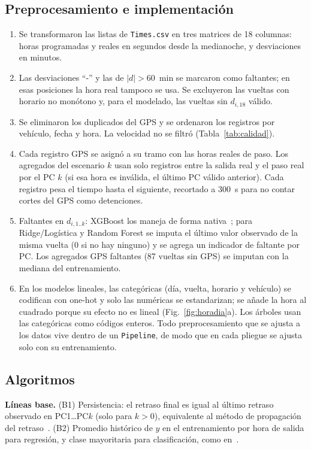 \documentclass[conference]{IEEEtran}
\begin{document}
\subsection{Preprocesamiento e implementación}\label{sec:prep}
\begin{enumerate}
\item Se transformaron las listas de \texttt{Times.csv} en tres matrices de 18 columnas: horas programadas y reales en segundos desde la medianoche, y desviaciones en minutos.
\item Las desviaciones ``-'' y las de $|d| > 60$~min se marcaron como faltantes; en esas posiciones la hora real tampoco se usa. Se excluyeron las vueltas con horario no monótono y, para el modelado, las vueltas sin $d_{i,18}$ válido.
\item Se eliminaron los duplicados del GPS y se ordenaron los registros por vehículo, fecha y hora. La velocidad no se filtró (Tabla~\ref{tab:calidad}).
\item Cada registro GPS se asignó a su tramo con las horas reales de paso. Los agregados del escenario $k$ usan solo registros entre la salida real y el paso real por el PC $k$ (si esa hora es inválida, el último PC válido anterior). Cada registro pesa el tiempo hasta el siguiente, recortado a 300~s para no contar cortes del GPS como detenciones.
\item Faltantes en $d_{i,1..k}$: XGBoost los maneja de forma nativa~\cite{chen2016}; para Ridge/Logística y Random Forest se imputa el último valor observado de la misma vuelta (0 si no hay ninguno) y se agrega un indicador de faltante por PC. Los agregados GPS faltantes (87 vueltas sin GPS) se imputan con la mediana del entrenamiento.
\item En los modelos lineales, las categóricas (día, vuelta, horario y vehículo) se codifican con one-hot y solo las numéricas se estandarizan; se añade la hora al cuadrado porque su efecto no es lineal (Fig.~\ref{fig:horadia}a). Los árboles usan las categóricas como códigos enteros. Todo preprocesamiento que se ajusta a los datos vive dentro de un \texttt{Pipeline}, de modo que en cada pliegue se ajusta solo con su entrenamiento.
\end{enumerate}

\subsection{Algoritmos}
\textbf{Líneas base.} (B1) Persistencia: el retraso final es igual al último retraso observado en PC1\ldots PC$k$ (solo para $k > 0$), equivalente al método de propagación del retraso~\cite{liu2020}. (B2) Promedio histórico de $y$ en el entrenamiento por hora de salida para regresión, y clase mayoritaria para clasificación, como en~\cite{taparia2020}.
\end{document}

